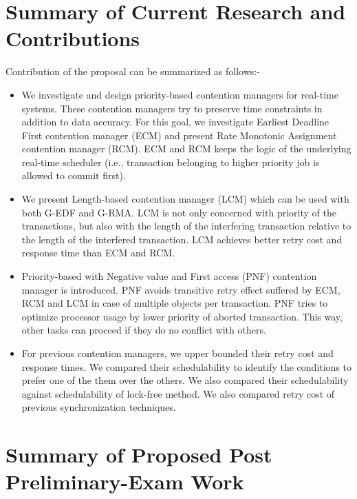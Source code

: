 \documentclass[12pt,english]{report}
\begin{document}
\section{\label{sec:summary of current research}Summary of Current Research and Contributions}
Contribution of the proposal can be summarized as follows:-
\begin{itemize}
\item We investigate and design priority-based contention managers for real-time systems. These contention managers try to preserve time constraints in addition to data accuracy. For this goal, we investigate Earliest Deadline First contention manager (ECM) and present Rate Monotonic Assignment contention manager (RCM). ECM and RCM keeps the logic of the underlying real-time scheduler (i.e., transaction belonging to higher priority job is allowed to commit first).
\item We present Length-based contention manager (LCM) which can be used with both G-EDF and G-RMA. LCM is not only concerned with priority of the transactions, but also with the length of the interfering transaction relative to the length of the interfered transaction. LCM achieves better retry cost and response time than ECM and RCM.
\item Priority-based with Negative value and First access (PNF) contention manager is introduced. PNF avoids transitive retry effect suffered by ECM, RCM and LCM in case of multiple objects per transaction. PNF tries to optimize processor usage by lower priority of aborted transaction. This way, other tasks can proceed if they do no conflict with others.
\item For previous contention managers, we upper bounded their retry cost and response times. We compared their schedulability to identify the conditions to prefer one of the them over the others. We also compared their schedulability against schedulability of lock-free method. We also compared retry cost of previous synchronization techniques.
\end{itemize}

\section{\label{sec:postprelim work}Summary of Proposed Post Preliminary-Exam Work}
\end{document}
